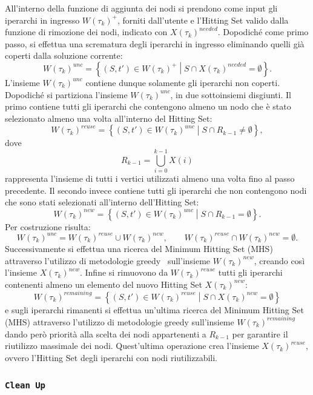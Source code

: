 All'interno della funzione di aggiunta dei nodi si prendono come input gli iperarchi in ingresso $W{(\tau_k)}^{+}$, forniti dall'utente e l'Hitting Set valido dalla funzione di rimozione dei nodi, indicato con $X{(\tau_k)}^{needed}$.
Dopodiché come primo passo, si effettua una scrematura degli iperarchi in ingresso eliminando quelli già coperti dalla soluzione corrente:
\[
W{(\tau_k)}^{unc} =\left\{ (S,t')\in W{(\tau_k)}^{+} \middle| S\cap X{(\tau_k)}^{needed}=\emptyset \right\}.
\]
L'insieme $W{(\tau_k)}^{unc}$ contiene dunque solamente gli iperarchi non coperti.
Dopodiché si partiziona l'insieme $W{(\tau_k)}^{unc}$, in due sottoinsiemi disgiunti.
Il primo contiene tutti gli iperarchi che contengono almeno un nodo che è stato selezionato almeno una volta all'interno del Hitting Set:
\[
W{(\tau_k)}^{reuse} =\left\{ (S,t')\in W{(\tau_k)}^{unc} \middle| S\cap R_{k-1}\neq\emptyset \right\},
\]
dove
\[
R_{k-1} =\bigcup_{i=0}^{k-1}X(i)
\]
rappresenta l'insieme di tutti i vertici utilizzati almeno una volta fino al passo precedente.
Il secondo invece contiene tutti gli iperarchi che non contengono nodi che sono stati selezionati all'interno dell'Hitting Set:
\[
W{(\tau_k)}^{new} =\left\{ (S,t')\in W{(\tau_k)}^{unc} \middle| S\cap R_{k-1}=\emptyset \right\}.
\]
Per costruzione risulta:
\[
W{(\tau_k)}^{unc} =W{(\tau_k)}^{reuse}\cup W{(\tau_k)}^{new},\qquad W{(\tau_k)}^{reuse}\cap W{(\tau_k)}^{new}=\emptyset.
\]
Successivamente si effettua una ricerca del Minimum Hitting Set (MHS) attraverso l'utilizzo di metodologie greedy~\cite{johnson1974, chvatal1979} sull'insieme $W{(\tau_k)}^{new}$, creando così l'insieme $X{(\tau_k)}^{new}$.
Infine si rimuovono da $W{(\tau_k)}^{reuse}$ tutti gli iperarchi contenenti almeno un elemento del nuovo Hitting Set $X{(\tau_k)}^{new}$:
\[
W{(\tau_k)}^{remaining} =\left\{ (S,t')\in W{(\tau_k)}^{reuse} \middle| S\cap X{(\tau_k)}^{new}=\emptyset \right\}
\]
e sugli iperarchi rimanenti si effettua un'ultima ricerca del Minimum Hitting Set (MHS) attraverso l'utilizzo di metodologie greedy sull'insieme $W{(\tau_k)}^{remaining}$ dando però priorità alla scelta dei nodi appartenenti a $R_{k-1}$ per garantire il riutilizzo massimale dei nodi.
Quest'ultima operazione crea l'insieme $X{(\tau_k)}^{reuse}$, ovvero l'Hitting Set degli iperarchi con nodi riutilizzabili.

\subsubsection*{\texttt{Clean Up}}

